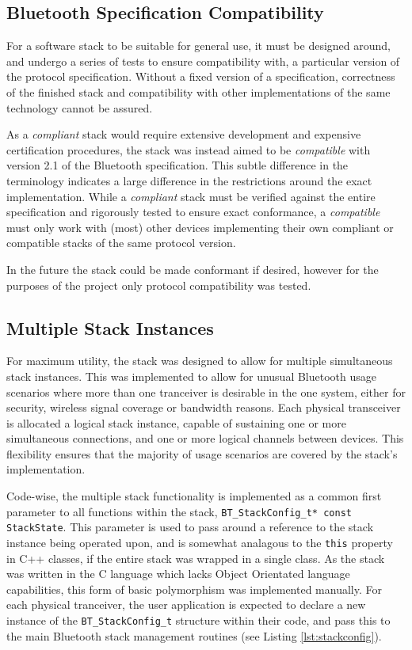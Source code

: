 \FloatBarrier
\subsection{Bluetooth Specification Compatibility}

For a software stack to be suitable for general use, it must be designed around, and undergo a series of tests to ensure compatibility with, a particular version of the protocol specification. Without a fixed version of a specification, correctness of the finished stack and compatibility with other implementations of the same technology cannot be assured.

As a \textit{compliant} stack would require extensive development and expensive certification procedures, the stack was instead aimed to be \textit{compatible} with version 2.1 of the Bluetooth specification. This subtle difference in the terminology indicates a large difference in the restrictions around the exact implementation. While a \textit{compliant} stack must be verified against the entire specification and rigorously tested to ensure exact conformance, a \textit{compatible} must only work with (most) other devices implementing their own compliant or compatible stacks of the same protocol version.

In the future the stack could be made conformant if desired, however for the purposes of the project only protocol compatibility was tested.

\FloatBarrier
\subsection{Multiple Stack Instances}

For maximum utility, the stack was designed to allow for multiple simultaneous stack instances. This was implemented to allow for unusual Bluetooth usage scenarios where more than one tranceiver is desirable in the one system, either for security, wireless signal coverage or bandwidth reasons. Each physical transceiver is allocated a logical stack instance, capable of sustaining one or more simultaneous connections, and one or more logical channels between devices. This flexibility ensures that the majority of usage scenarios are covered by the stack's implementation.

Code-wise, the multiple stack functionality is implemented as a common first parameter to all functions within the stack, \lstinline{BT_StackConfig_t* const StackState}. This parameter is used to pass around a reference to the stack instance being operated upon, and is somewhat analagous to the \lstinline{this} property in C++ classes, if the entire stack was wrapped in a single class. As the stack was written in the C language which lacks Object Orientated language capabilities, this form of basic polymorphism was implemented manually. For each physical tranceiver, the user application is expected to declare a new instance of the \lstinline{BT_StackConfig_t} structure within their code, and pass this to the main Bluetooth stack management routines (see Listing \ref{lst:stackconfig}).

